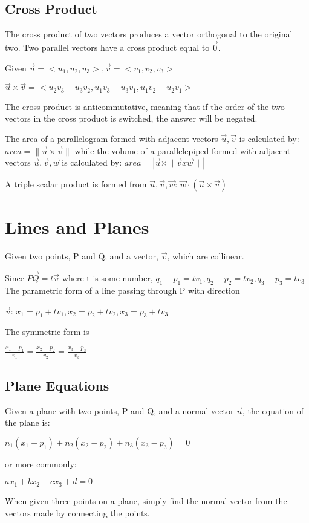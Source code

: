 \documentclass [12 pt, oneside] {book}
\begin{document}
\subsection{Cross Product}
The cross product of two vectors produces a vector orthogonal to the original two. Two parallel vectors have a cross product equal to $\vec{0}$.

Given $\vec{u}=<u_1,u_2,u_3>, \vec{v}=<v_1,v_2,v_3>$

$\vec{u}\times\vec{v}=<u_2v_3-u_3v_2, u_1v_3-u_3v_1, u_1v_2-u_2v_1>$

The cross product is anticommutative, meaning that if the order of the two vectors in the cross product is switched, the answer will be negated.

The area of a parallelogram formed with adjacent vectors $\vec{u}, \vec{v}$ is calculated by:
$area=\|\vec{u}\times\vec{v}\|$
while the volume of a parallelepiped formed with adjacent vectors $\vec{u}, \vec{v}, \vec{w}$ is calculated by:
$area=|\vec{u}\times\|\vec{v}x\vec{w}\||$

A triple scalar product is formed from $\vec{u},\vec{v},\vec{w}$: $\vec{w}\cdot(\vec{u}\times\vec{v})$

\section{Lines and Planes}
Given two points, P and Q, and a vector, $\vec{v}$, which are collinear.

Since $\vec{PQ}=t\vec{v}$ where t is some number, $q_1-p_1=tv_1, q_2-p_2=tv_2, q_3-p_3=tv_3$
The parametric form of a line passing through P with direction 
\begin{center}$\vec{v}$: $x_1=p_1+tv_1, x_2=p_2+tv_2, x_3=p_3+tv_3$\end{center}
The symmetric form is 
\begin{center}$\frac{x_1-p_1}{v_1}=\frac{x_2-p_2}{v_2}=\frac{x_3-p_3}{v_3}$\end{center}

\subsection{Plane Equations}
Given a plane with two points, P and Q, and a normal vector $\vec{n}$, the equation of the plane is:
\begin{center}$n_1(x_1-p_1)+n_2(x_2-p_2)+n_3(x_3-p_3)=0$ \end{center}
or more commonly:
\begin{center} $ax_1+bx_2+cx_3+d=0$\end{center} 
When given three points on a plane, simply find the normal vector from the vectors made by connecting the points.
\end{document}
